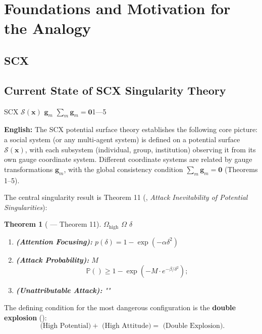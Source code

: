 \documentclass[12pt,a4paper]{article}
\newtheorem{theorem}{Theorem}[section]
\theoremstyle{remark}
\newcommand{\Pbb}{\mathbb{P}}
\newcommand{\g}{\mathbf{g}}
\newcommand{\x}{\mathbf{x}}
\begin{document}
\section{Foundations and Motivation for the Analogy}

\subsection{SCX}
\subsection{Current State of SCX Singularity Theory}

SCX $\mathcal{S}(\x)$  $\g_m$  $\sum_m \g_m = \mathbf{0}$1—5

\vspace{4pt}
\noindent
\textbf{English:} The SCX potential surface theory establishes the following core picture: a social system (or any multi-agent system) is defined on a potential surface $\mathcal{S}(\x)$, with each subsystem (individual, group, institution) observing it from its own gauge coordinate system. Different coordinate systems are related by gauge transformations $\g_m$, with the global consistency condition $\sum_m \g_m = \mathbf{0}$ (Theorems 1--5).

The central singularity result is Theorem 11 (, \textit{Attack Inevitability of Potential Singularities}):

\begin{theorem}[ — Theorem 11]\label{thm:original_11}
 $\Omega_{\mathrm{high}}$  $\Omega$  $\delta$
\begin{enumerate}[label=(\roman*)]
    \item \textbf{ (Attention Focusing):}  $p(\delta) = 1 - \exp(-\alpha\delta^2)$ 
    \item \textbf{ (Attack Probability):} $M$ 
    \begin{equation}
        \Pbb(\text{}) \geq 1 - \exp\left(-M \cdot e^{-\beta/\delta^2}\right);
    \end{equation}
    \item \textbf{ (Unattributable Attack):} ""
\end{enumerate}
\end{theorem}

The defining condition for the most dangerous configuration is the \textbf{double explosion} ():
\begin{equation}
    \text{ (High Potential)} + \text{ (High Attitude)} = \text{ (Double Explosion)}.
\end{equation}
\end{document}
